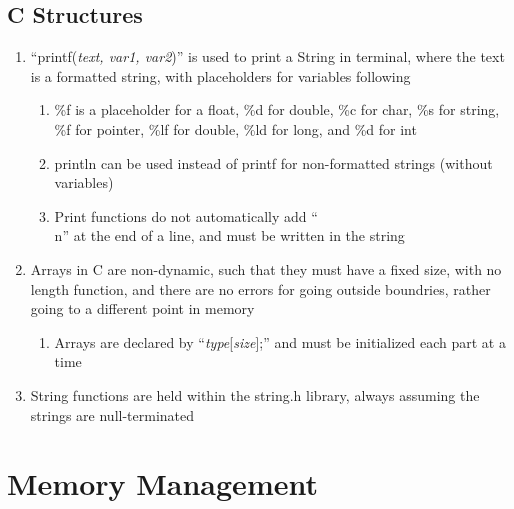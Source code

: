 \documentclass[11 pt, twoside]{article}
\begin{document}
\subsection{C Structures}
\begin{enumerate}
\item ``printf(\textit{text, var1, var2})'' is used to print a String in terminal, where the text is a formatted string, with placeholders for variables following
\begin{enumerate}
\item \%f is a placeholder for a float, \%d for double, \%c for char, \%s for string, \%f for pointer, \%lf for double, \%ld for long, and \%d for int
\item println can be used instead of printf for non-formatted strings (without variables)
\item Print functions do not automatically add ``\\n'' at the end of a line, and must be written in the string
\end{enumerate}
\item Arrays in C are non-dynamic, such that they must have a fixed size, with no length function, and there are no errors for going outside boundries, rather going to a different point in memory
\begin{enumerate}
\item Arrays are declared by ``\textit{type}[\textit{size}];'' and must be initialized each part at a time
\end{enumerate}
\item String functions are held within the string.h library, always assuming the strings are null-terminated
\end{enumerate}

\section{Memory Management}
\end{document}
